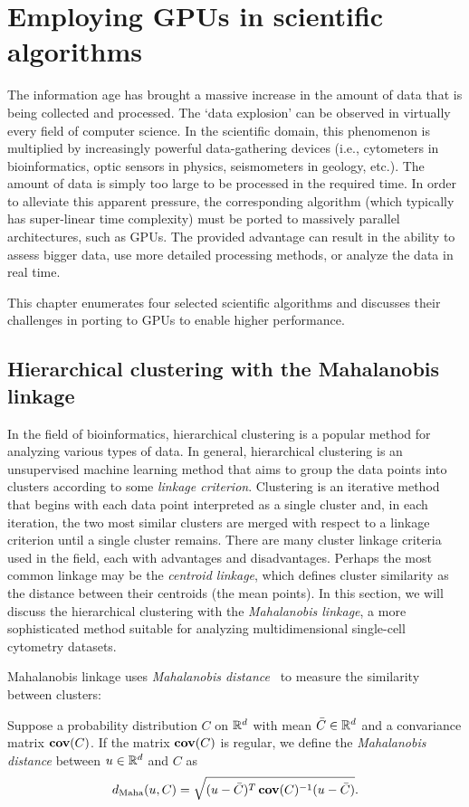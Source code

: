 \chapter{Employing GPUs in scientific algorithms}

The information age has brought a massive increase in the amount of data that is being collected and processed. The `data explosion' can be observed in virtually every field of computer science. In the scientific domain, this phenomenon is multiplied by increasingly powerful data-gathering devices (i.e., cytometers in bioinformatics, optic sensors in physics, seismometers in geology, etc.). The amount of data is simply too large to be processed in the required time. In order to alleviate this apparent pressure, the corresponding algorithm (which typically has super-linear time complexity) must be ported to massively parallel architectures, such as GPUs. The provided advantage can result in the ability to assess bigger data, use more detailed processing methods, or analyze the data in real time.

This chapter enumerates four selected scientific algorithms and discusses their challenges in porting to GPUs to enable higher performance.

\section{Hierarchical clustering with the Ma\-ha\-la\-no\-bis linkage}

In the field of bioinformatics, hierarchical clustering is a popular method for analyzing various types of data. 
In general, hierarchical clustering is an unsupervised machine learning method that aims to group the data points into clusters according to some \emph{linkage criterion}.
Clustering is an iterative method that begins with each data point interpreted as a single cluster and, in each iteration, the two most similar clusters are merged with respect to a linkage criterion until a single cluster remains.
There are many cluster linkage criteria used in the field, each with advantages and disadvantages. 
Perhaps the most common linkage may be the \emph{centroid linkage}, which defines cluster similarity as the distance between their centroids (the mean points). In this section, we will discuss the hierarchical clustering with the \emph{Mahalanobis linkage}, a more sophisticated method suitable for analyzing multidimensional single-cell cytometry datasets.

Mahalanobis linkage uses \emph{Mahalanobis distance}~\cite{mahalanobis1936generalized} to measure the similarity between clusters:
\begin{defn}
    Suppose a probability distribution $C$ on $\mathbb{R}^d$ with mean $\bar{C} \in \mathbb{R}^d$ and a convariance matrix $\operatorname{\textbf{cov}}(C)$. If the matrix $\operatorname{\textbf{cov}}(C)$ is regular, we define the \emph{Mahalanobis distance} between $u \in \mathbb{R}^d$ and $C$ as
    \begin{equation}
    d_\text{Maha}(u,C) = \sqrt{(u-\bar{C})^T\operatorname{\textbf{cov}}(C)^{-1}(u-\bar{C})}.
    \end{equation}\label{eq01:maha}
\end{defn}

